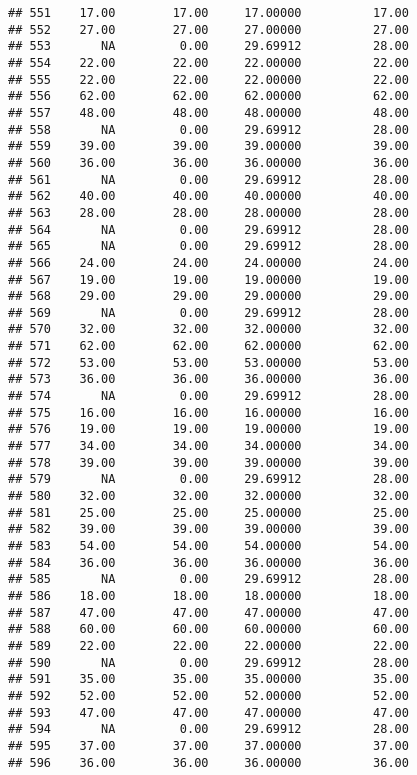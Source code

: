 \documentclass[
]{article}
\begin{document}
\begin{verbatim}
## 551    17.00        17.00     17.00000          17.00
## 552    27.00        27.00     27.00000          27.00
## 553       NA         0.00     29.69912          28.00
## 554    22.00        22.00     22.00000          22.00
## 555    22.00        22.00     22.00000          22.00
## 556    62.00        62.00     62.00000          62.00
## 557    48.00        48.00     48.00000          48.00
## 558       NA         0.00     29.69912          28.00
## 559    39.00        39.00     39.00000          39.00
## 560    36.00        36.00     36.00000          36.00
## 561       NA         0.00     29.69912          28.00
## 562    40.00        40.00     40.00000          40.00
## 563    28.00        28.00     28.00000          28.00
## 564       NA         0.00     29.69912          28.00
## 565       NA         0.00     29.69912          28.00
## 566    24.00        24.00     24.00000          24.00
## 567    19.00        19.00     19.00000          19.00
## 568    29.00        29.00     29.00000          29.00
## 569       NA         0.00     29.69912          28.00
## 570    32.00        32.00     32.00000          32.00
## 571    62.00        62.00     62.00000          62.00
## 572    53.00        53.00     53.00000          53.00
## 573    36.00        36.00     36.00000          36.00
## 574       NA         0.00     29.69912          28.00
## 575    16.00        16.00     16.00000          16.00
## 576    19.00        19.00     19.00000          19.00
## 577    34.00        34.00     34.00000          34.00
## 578    39.00        39.00     39.00000          39.00
## 579       NA         0.00     29.69912          28.00
## 580    32.00        32.00     32.00000          32.00
## 581    25.00        25.00     25.00000          25.00
## 582    39.00        39.00     39.00000          39.00
## 583    54.00        54.00     54.00000          54.00
## 584    36.00        36.00     36.00000          36.00
## 585       NA         0.00     29.69912          28.00
## 586    18.00        18.00     18.00000          18.00
## 587    47.00        47.00     47.00000          47.00
## 588    60.00        60.00     60.00000          60.00
## 589    22.00        22.00     22.00000          22.00
## 590       NA         0.00     29.69912          28.00
## 591    35.00        35.00     35.00000          35.00
## 592    52.00        52.00     52.00000          52.00
## 593    47.00        47.00     47.00000          47.00
## 594       NA         0.00     29.69912          28.00
## 595    37.00        37.00     37.00000          37.00
## 596    36.00        36.00     36.00000          36.00

\end{verbatim}
\end{document}
